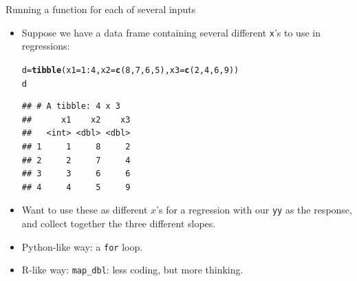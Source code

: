 \documentclass[unknownkeysallowed]{beamer}\usepackage[]{graphicx}\usepackage[]{color}
\makeatletter
\newcommand{\hlnum}[1]{\textcolor[rgb]{0.686,0.059,0.569}{#1}}%
\newcommand{\hlopt}[1]{\textcolor[rgb]{0,0,0}{#1}}%
\newcommand{\hlstd}[1]{\textcolor[rgb]{0.345,0.345,0.345}{#1}}%
\newcommand{\hlkwb}[1]{\textcolor[rgb]{0.69,0.353,0.396}{#1}}%
\newcommand{\hlkwc}[1]{\textcolor[rgb]{0.333,0.667,0.333}{#1}}%
\newcommand{\hlkwd}[1]{\textcolor[rgb]{0.737,0.353,0.396}{\textbf{#1}}}%
\newenvironment{kframe}{%
 \def\at@end@of@kframe{}%
 \ifinner\ifhmode%
  \def\at@end@of@kframe{\end{minipage}}%
  \begin{minipage}{\columnwidth}%
 \fi\fi%
 \def\FrameCommand##1{\hskip\@totalleftmargin \hskip-\fboxsep
 \colorbox{shadecolor}{##1}\hskip-\fboxsep
     \hskip-\linewidth \hskip-\@totalleftmargin \hskip\columnwidth}%
 \MakeFramed {\advance\hsize-\width
   \@totalleftmargin\z@ \linewidth\hsize
   \@setminipage}}%
 {\par\unskip\endMakeFramed%
 \at@end@of@kframe}
\newenvironment{knitrout}{}{} %
\makeatother
\begin{document}
\begin{frame}[fragile]{Running a function for each of several inputs}
  
  \begin{itemize}
  \item Suppose we have a data frame containing several different
    \texttt{x}'s to use in regressions:
    
\begin{knitrout}
\color{fgcolor}\begin{kframe}
\begin{alltt}
\hlstd{d}\hlkwb{=}\hlkwd{tibble}\hlstd{(}\hlkwc{x1}\hlstd{=}\hlnum{1}\hlopt{:}\hlnum{4}\hlstd{,}\hlkwc{x2}\hlstd{=}\hlkwd{c}\hlstd{(}\hlnum{8}\hlstd{,}\hlnum{7}\hlstd{,}\hlnum{6}\hlstd{,}\hlnum{5}\hlstd{),}\hlkwc{x3}\hlstd{=}\hlkwd{c}\hlstd{(}\hlnum{2}\hlstd{,}\hlnum{4}\hlstd{,}\hlnum{6}\hlstd{,}\hlnum{9}\hlstd{))}
\hlstd{d}
\end{alltt}
\begin{verbatim}
## # A tibble: 4 x 3
##      x1    x2    x3
##   <int> <dbl> <dbl>
## 1     1     8     2
## 2     2     7     4
## 3     3     6     6
## 4     4     5     9
\end{verbatim}
\end{kframe}
\end{knitrout}
\item Want to use these as different $x$'s for a regression with our
  \texttt{yy} as the response, and collect together the three
  different slopes.
\item Python-like way: a \texttt{for} loop.
\item R-like way: \texttt{map\_dbl}: less coding, but more thinking.    
  \end{itemize}
  
\end{frame}
\end{document}
